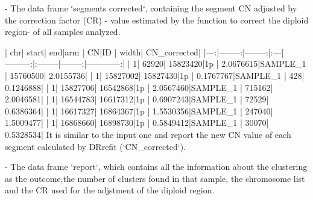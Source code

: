 \documentclass{article}
\begin{document}
-   The data frame `segments corrected`, containing the segment CN adjusted by the correction factor (CR) - value estimated by the function to correct the diploid region- of all samples analyzed.
\begin{Schunk}
\end{Schunk}
| chr|    start|      end|arm |        CN|ID       |    width| CN_corrected|
|---:|--------:|--------:|:---|---------:|:--------|--------:|------------:|
|   1|    62920| 15823420|1p  | 2.0676615|SAMPLE_1 | 15760500|    2.0155736|
|   1| 15827002| 15827430|1p  | 0.1767767|SAMPLE_1 |      428|    0.1246888|
|   1| 15827706| 16542868|1p  | 2.0567460|SAMPLE_1 |   715162|    2.0046581|
|   1| 16544783| 16617312|1p  | 0.6907243|SAMPLE_1 |    72529|    0.6386364|
|   1| 16617327| 16864367|1p  | 1.5530356|SAMPLE_1 |   247040|    1.5009477|
|   1| 16868660| 16898730|1p  | 0.5849412|SAMPLE_1 |    30070|    0.5328534|
It is similar to the input one and report the new CN value of each segment calculated by DRrefit (`CN_corrected`).

-   The data frame `report`, which contains all the information about the clustering as the outcome,the number of clusters found in that sample, the chromosome list and the CR used for the adjstment of the diploid region.
\end{document}
